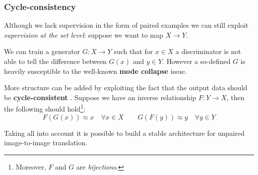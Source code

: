 \begin{frame}
    \frametitle{Cycle-consistency}
    Although we lack supervision in the form of paired examples we can still exploit \emph{supervision at the set level}: suppose we want to map $X \to Y$.

    We can train a generator $G: X \to Y$ such that for $x \in X$ a discriminator is not able to tell the difference between $G(x)$ and $y \in Y$. However a so-defined $G$ is heavily susceptible to the well-known \textbf{mode collapse} issue.

    More structure can be added by exploiting the fact that the output data should be \textbf{cycle-consistent} \cite{cyclegan}. Suppose we have an inverse relationship $F: Y \to X$, then the following should hold\footnote{Moreover, $F$ and $G$ are \emph{bijections}.}:
    $$F(G(x)) \approx x \quad \forall x \in X \qquad G(F(y)) \approx y \quad \forall y \in Y$$

    Taking all into account it is possible to build a stable architecture for unpaired image-to-image translation.
\end{frame}